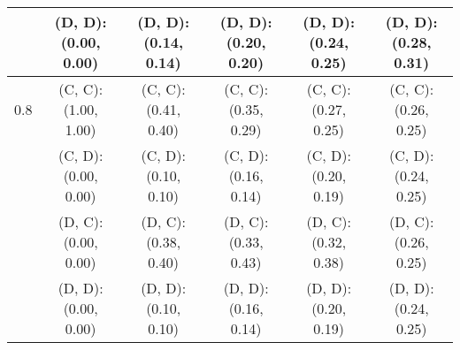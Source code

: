 \begin{tabular}{c | c c c c c}
 & (D, D): (0.00, 0.00) & (D, D): (0.14, 0.14) & (D, D): (0.20, 0.20) & (D, D): (0.24, 0.25) & (D, D): (0.28, 0.31) \\
\hline
0.8 & (C, C): (1.00, 1.00) & (C, C): (0.41, 0.40) & (C, C): (0.35, 0.29) & (C, C): (0.27, 0.25) & (C, C): (0.26, 0.25) \\
 & (C, D): (0.00, 0.00) & (C, D): (0.10, 0.10) & (C, D): (0.16, 0.14) & (C, D): (0.20, 0.19) & (C, D): (0.24, 0.25) \\
 & (D, C): (0.00, 0.00) & (D, C): (0.38, 0.40) & (D, C): (0.33, 0.43) & (D, C): (0.32, 0.38) & (D, C): (0.26, 0.25) \\
 & (D, D): (0.00, 0.00) & (D, D): (0.10, 0.10) & (D, D): (0.16, 0.14) & (D, D): (0.20, 0.19) & (D, D): (0.24, 0.25) \\
\end{tabular}
